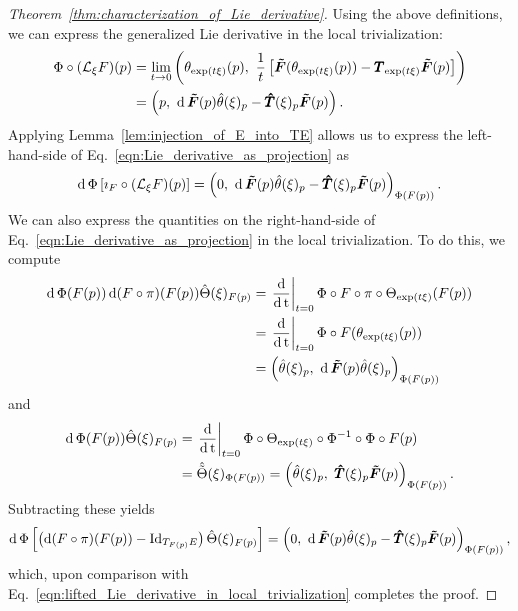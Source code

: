 \documentclass[twoside,11pt]{article}
\begin{document}
\begin{proof}[Theorem~\ref{thm:characterization_of_Lie_derivative}]
Using the above definitions, we can express the generalized Lie derivative in the local trivialization:
\begin{equation}
    \begin{aligned}
        \Phi \circ (\mcal{L}_{\xi} F) (p) 
        &= 
        \lim_{t\to 0} \left( \theta_{\exp(t\xi)}(p) ,\ 
        \frac{1}{t}\left[ \vect{\tilde{F}}(\theta_{\exp(t\xi)}(p)) - \mat{T}_{\exp(t\xi)} \vect{\tilde{F}}(p) \right] \right) \\
        &= \left( p, \ \D\vect{\tilde{F}}(p)\hat{\theta}(\xi)_p - \mat{\hat{T}}(\xi)_p\vect{\tilde{F}}(p) \right).
    \end{aligned}
    \label{eqn:Lie_derivative_in_local_trivialization}
\end{equation}
Applying Lemma~\ref{lem:injection_of_E_into_TE} allows us to express the left-hand-side of Eq.~\ref{eqn:Lie_derivative_as_projection} as
\begin{equation}
    \operatorname{\mathrm{d}}\Phi \left[ \imath_F \circ ({\mathcal{L}}_{\xi} F) (p) \right] =
    \left(0, \ \operatorname{\mathrm{d}}{\boldsymbol{\tilde{F}}}(p)\hat{\theta}(\xi)_p - {\pmb{\hat{T}}}(\xi)_p{\boldsymbol{\tilde{F}}}(p) \right)_{\Phi(F(p))}.
    \label{eqn:lifted_Lie_derivative_in_local_trivialization}
\end{equation}
We can also express the quantities on the right-hand-side of Eq.~\ref{eqn:Lie_derivative_as_projection} in the local trivialization.
To do this, we compute
\begin{equation}
    \begin{aligned}
        \D \Phi(F(p)) \D (F \circ \pi)(F(p)) \hat{{\Theta}}(\xi)_{F(p)} 
        &= \left.\ddt\right\vert_{t=0} \Phi \circ F \circ \pi \circ \Theta_{\exp(t\xi)}(F(p)) \\
        &= \left.\ddt\right\vert_{t=0} \Phi \circ F(\theta_{\exp(t\xi)}(p)) \\
        &= \left( \hat{\theta}(\xi)_p, \ \D\vect{\tilde{F}}(p)\hat{\theta}(\xi)_p \right)_{\Phi(F(p))}
    \end{aligned}
\end{equation}
and
\begin{equation}
    \begin{aligned}
        \operatorname{\mathrm{d}}\Phi(F(p)) \hat{\Theta}(\xi)_{F(p)} 
        &= \left. \operatorname{\frac{\operatorname{\mathrm{d}}}{\operatorname{\mathrm{d}} t}} \right\vert_{t=0} \Phi \circ \Theta_{\exp(t\xi)} \circ \Phi^{-1} \circ \Phi \circ F(p) \\
        &= \hat{\tilde{\Theta}}(\xi)_{\Phi(F(p))}
        = \left( \hat{\theta}(\xi)_p, \ {\pmb{\hat{T}}}(\xi)_p {\boldsymbol{\tilde{F}}}(p) \right)_{\Phi(F(p))}.
    \end{aligned}
\end{equation}
Subtracting these yields
\begin{equation}
    \operatorname{\mathrm{d}}\Phi \left[ \left( \operatorname{\mathrm{d}}(F\circ\pi)(F(p)) - \operatorname{Id}_{T_{F(p)}E} \right) \hat{\Theta}(\xi)_{F(p)} \right]
    = \left( 0, \ \operatorname{\mathrm{d}}{\boldsymbol{\tilde{F}}}(p)\hat{\theta}(\xi)_p - {\pmb{\hat{T}}}(\xi)_p {\boldsymbol{\tilde{F}}}(p) \right)_{\Phi(F(p))},
\end{equation}
which, upon comparison with Eq.~\ref{eqn:lifted_Lie_derivative_in_local_trivialization} completes the proof.
\end{proof}
\end{document}
